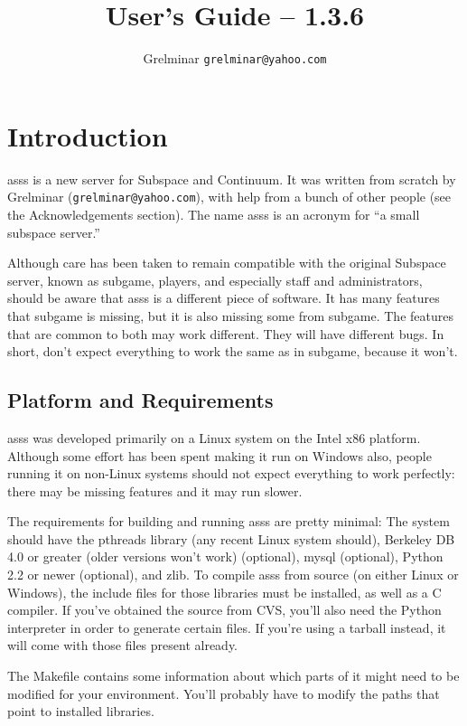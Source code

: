 \documentclass{article}
\title{\asss{} User's Guide -- 1.3.6}
\author{\small Grelminar \lt{}\texttt{grelminar@yahoo.com}\gt{}}
\newcommand{\asss}{asss}
\newcommand{\subgame}{subgame}
\begin{document}
\maketitle

\section{Introduction}

\asss{} is a new server for Subspace and Continuum. It was written from
scratch by Grelminar (\verb/grelminar@yahoo.com/), with help from a
bunch of other people (see the Acknowledgements section). The name
\asss{} is an acronym for ``a small subspace server.''

Although care has been taken to remain compatible with the original
Subspace server, known as \subgame{}, players, and especially staff and
administrators, should be aware that \asss{} is a different piece of
software. It has many features that \subgame{} is missing, but it is
also missing some from \subgame{}. The features that are common to both
may work different. They will have different bugs. In short, don't
expect everything to work the same as in \subgame{}, because it won't.

\subsection{Platform and Requirements}

\asss{} was developed primarily on a Linux system on the Intel x86
platform. Although some effort has been spent making it run on Windows
also, people running it on non-Linux systems should not expect
everything to work perfectly: there may be missing features and it may
run slower.

The requirements for building and running \asss{} are pretty minimal:
The system should have the pthreads library (any recent Linux system
should), Berkeley DB 4.0 or greater (older versions won't work)
(optional), mysql (optional), Python 2.2 or newer (optional), and zlib.
To compile \asss{} from source (on either Linux or Windows), the include
files for those libraries must be installed, as well as a C compiler. If
you've obtained the source from CVS, you'll also need the Python
interpreter in order to generate certain files. If you're using a
tarball instead, it will come with those files present already.

The Makefile contains some information about which parts of it might
need to be modified for your environment. You'll probably have to modify
the paths that point to installed libraries.
\end{document}
